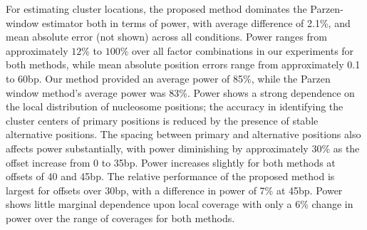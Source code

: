 For estimating cluster locations, the proposed method dominates the Parzen-window estimator both in terms of power, with average difference of 2.1\%, and mean absolute error (not shown) across all conditions.
Power ranges from approximately $12\%$ to $100\%$ over all factor combinations in our experiments for both methods, while mean absolute position errors range from approximately 0.1 to 60bp.
Our method provided an average power of 85\%, while the Parzen window method's average power was 83\%.
Power shows a strong dependence on the local distribution of nucleosome positions; the accuracy in identifying the cluster centers of primary positions is reduced by the presence of stable alternative positions.
The spacing between primary and alternative positions also affects power substantially, with power diminishing by approximately 30\% as the offset increase from 0 to 35bp.
Power increases slightly for both methods at offsets of 40 and 45bp.
The relative performance of the proposed method is largest for offsets over 30bp, with a difference in power of 7\% at 45bp.
Power shows little marginal dependence upon local coverage with only a 6\% change in power over the range of coverages for both methods.

